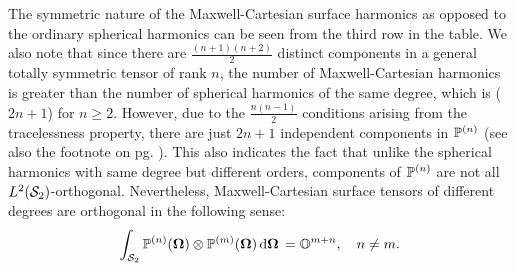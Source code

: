 The symmetric nature of the Maxwell-Cartesian surface harmonics as opposed to the ordinary spherical harmonics can be
 seen from the third row in the table. We also note that since there are $\frac{(n+1)(n+2)}{2}$ distinct components in a general 
 totally symmetric tensor of rank $n$, the number of Maxwell-Cartesian harmonics is greater than the number of spherical 
 harmonics of the same degree, which is ($2n + 1$) for $n \geq 2$. However, due to the $\frac{n(n-1)}{2}$ conditions 
 arising from the tracelessness property, there are just $2n + 1$ independent components in $\PP$ (see also the footnote 
 on pg. \pageref{pg:indepc}). This also indicates the fact that unlike the spherical harmonics with same degree but
 different orders, components of $\PP$ are not all $\Lp[2](\Sphere)$-orthogonal. Nevertheless, Maxwell-Cartesian surface
  tensors of different degrees are orthogonal in the following sense:
\begin{equation}\label{eq:OG}
  \intA{\PP[n](\bomega) \otimes \PP[m](\bomega)} = \mathbb{O}^{m+n},\quad n\neq m.
\end{equation}

